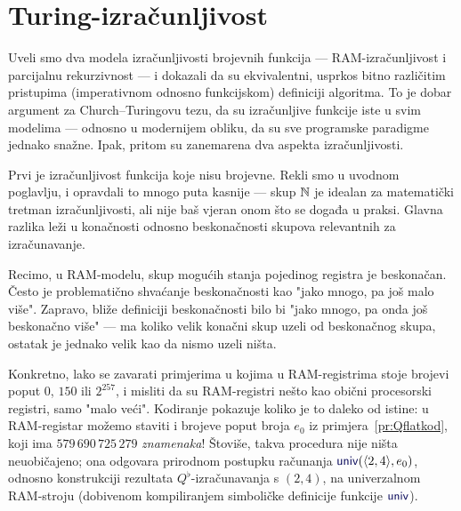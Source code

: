 \chapter{Turing-izračunljivost}\label{ch:Turing}


Uveli smo dva modela izračunljivosti brojevnih funkcija --- RAM-izračunljivost i parcijalnu rekurzivnost --- i dokazali da su ekvivalentni, usprkos bitno različitim pristupima (imperativnom odnosno funkcijskom) definiciji algoritma. To je dobar argument za Church--\!Turingovu tezu, da su izračunljive funkcije iste u svim modelima --- odnosno u modernijem obliku, da su sve programske paradigme jednako snažne. Ipak, pritom su zanemarena dva aspekta izračunljivosti.


Prvi je izračunljivost funkcija koje nisu brojevne. Rekli smo u uvodnom poglavlju, i opravdali to mnogo puta kasnije --- skup ${\mathbb N}$ je idealan za matematički tretman izračunljivosti, ali nije baš vjeran onom što se događa u praksi. Glavna razlika leži u konačnosti odnosno beskonačnosti skupova relevantnih za izračunavanje.

Recimo, u RAM-modelu, skup mogućih stanja pojedinog registra je beskonačan. Često je problematično shvaćanje beskonačnosti kao "jako mnogo, pa još malo više". Zapravo, bliže definiciji beskonačnosti bilo bi "jako mnogo, pa onda još beskonačno više" --- ma koliko velik konačni skup uzeli od beskonačnog skupa, ostatak je jednako velik kao da nismo uzeli ništa.

Konkretno, lako se zavarati primjerima u kojima u RAM-registrima stoje brojevi poput $0$, $150$ ili $2^{257}$, i misliti da su RAM-registri nešto kao obični procesorski registri, samo "malo veći". Kodiranje pokazuje koliko je to daleko od istine: u RAM-registar možemo staviti i brojeve poput broja $e_0$ iz primjera~\ref{pr:Qflatkod}, koji ima $579\,690\,725\,279$ \emph{znamenaka}! Štoviše, takva procedura nije ništa neuobičajeno; ona odgovara prirodnom postupku računanja $\f{univ}(\kr{2,4},e_0)$, odnosno konstrukciji rezultata $Q^\flat$-izračunavanja s $(2,4)$, na univerzalnom RAM-stroju (dobivenom kompiliranjem simboličke definicije funkcije $\f{univ}$).

